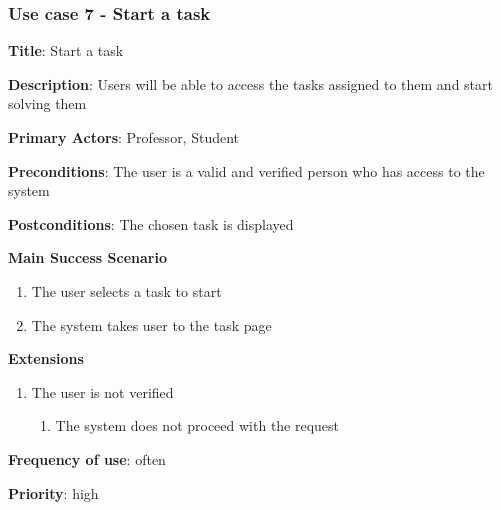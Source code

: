 \documentclass[singlespacing,12pt,parskip,headsepline,consistentlayout]{article}
\begin{document}
\pagebreak
\subsubsection{Use case 7 - Start a task}
\begin{flushleft}
\vspace{0.2cm}
\hline
\vspace{0.2cm}
{\bfseries Title}: {Start a task}

{\bfseries Description}: {Users will be able to access the tasks assigned to them and start solving them}

{\bfseries Primary Actors}: {Professor, Student}

{\bfseries Preconditions}: The user is a valid and verified person who has access to the system

{\bfseries Postconditions}: {The chosen task is displayed}

{\bfseries Main Success Scenario}

\begin{enumerate}
      \item The user selects a task to start
      \item The system takes user to the task page
\end{enumerate}
 
{\bfseries Extensions}

\begin{enumerate}
  \item The user is not verified
  \begin{enumerate}
      \item The system does not proceed with the request
  \end{enumerate}
\end{enumerate}

{\bfseries Frequency of use}: often

{\bfseries Priority}: high

\end{flushleft}

\pagebreak
\end{document}

